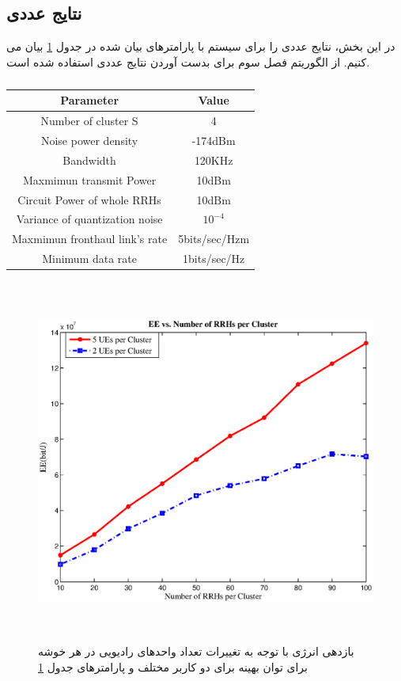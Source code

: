 \subsection{نتایج عددی}
در این بخش، نتایج عددی را برای سیستم  با پارامترهای بیان شده در جدول \ref{tab:title22} بیان می کنیم. از الگوریتم فصل سوم برای بدست آوردن نتایج عددی استفاده شده است.
\begin{latin} 
 \begin{table}[H]
 \caption {} \label{tab:title22} 
 \begin{center}
  \begin{tabular}{||c c ||} 
  \hline
  Parameter & Value \\ [0.5ex] 
  \hline\hline
  Number of cluster S & 4 \\ 
  \hline
  Noise power density & -174dBm\\
  \hline
  Bandwidth & 120KHz \\
  \hline
 Maxmimun transmit Power & 10dBm \\
  \hline
  Circuit Power of whole RRHs & 10dBm \\
  \hline
  Variance of quantization noise & $10^{-4}$ \\
  \hline
   Maxmimun fronthaul link's rate & 5bits/sec/Hzm \\
  \hline
  Minimum data rate &  1bits/sec/Hz \\ [1ex] 
  \hline
 \end{tabular}
 \end{center}
 \end{table}
 \end{latin}
  \begin{figure}[h]
  \centering
    \includegraphics[width=\linewidth, height=12cm]{./fig3/rrh1}
  \caption{
  بازدهی انرژی با توجه به تغییرات تعداد واحدهای رادیویی  در هر خوشه برای توان بهینه برای 
   دو کاربر مختلف
   و پارامترهای جدول \ref{tab:title22}}
  \label{fig:nem1}
\end{figure}
